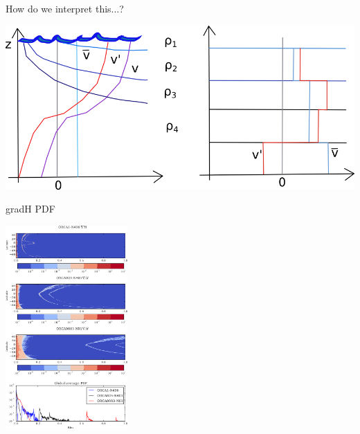 \documentclass{beamer}
\begin{document}

\begin{frame}{How do we interpret this...?}
  \begin{center} \includegraphics[width=1\textwidth]{rhoInfoGraphic.png}\end{center}
\end{frame}

\begin{frame}{gradH PDF}
  \begin{center} \includegraphics[width=0.35\textwidth]{PDF_H.png}\end{center}
\end{frame}
\end{document}
